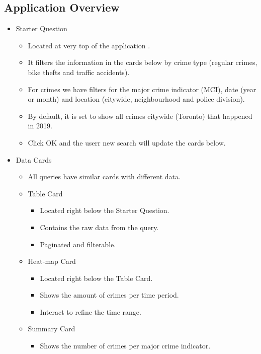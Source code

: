 \documentclass[12pt, a4paper]{article}
\begin{document}
\subsection*{Application Overview}
\color{black}
\begin{itemize}
    \item Starter Question
    \begin{itemize}
        \item Located at very top of the application .
        \item It filters the information in the cards below by crime type (regular crimes, bike thefts and traffic accidents). 
        \item  For crimes we have filters for the major crime indicator (MCI), date (year or month) and location (citywide, neighbourhood and police division). 
        \item By default, it is set to show all crimes citywide (Toronto) that happened in 2019.
        \item Click OK and the userr new search will update the cards below.
    \end{itemize}
    \item Data Cards
    \begin{itemize}
        \item All queries have similar cards with different data.
        \item Table Card
        \begin{itemize}
            \item Located right below the Starter Question.
            \item Contains the raw data from the query.
            \item Paginated and filterable.
        \end{itemize}
        \item Heat-map Card
        \begin{itemize}
            \item Located right below the Table Card.
            \item Shows the amount of crimes per time period. 
            \item Interact to refine the time range.
        \end{itemize}
        \item Summary Card
        \begin{itemize}
            \item Shows the number of crimes per major crime indicator. 
        \end{itemize}

\end{itemize}
\end{itemize}
\end{document}
